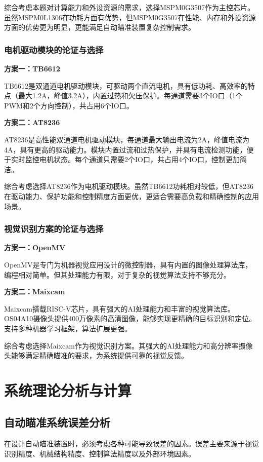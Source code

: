 \documentclass[12pt,a4paper]{ctexart}
\begin{document}
综合考虑本题对计算能力和外设资源的需求，选择MSPM0G3507作为主控芯片。虽然MSPM0L1306在功耗方面有优势，但MSPM0G3507在性能、内存和外设资源方面的优势更为明显，更能满足自动瞄准装置复杂控制需求。

\subsubsection{\textbf{电机驱动模块的论证与选择}}
\textbf{方案一：TB6612}

TB6612是双通道电机驱动模块，可驱动两个直流电机，具有低功耗、高效率的特点（最大1.2A，峰值3.2A），内置过热和欠压保护。每通道需要3个IO口（1个PWM和2个方向控制），共占用6个IO口。

\textbf{方案二：AT8236}

AT8236是高性能双通道电机驱动模块，每通道最大输出电流为2A，峰值电流为4A，具有更高的驱动能力。模块内置过流和过热保护，并具有电流检测功能，便于实时监控电机状态。每个通道只需要2个IO口，共占用4个IO口，控制更加简洁。

综合考虑选择AT8236作为电机驱动模块。虽然TB6612功耗相对较低，但AT8236在驱动能力、保护功能和控制精度方面更优，更适合需要高负载和精确控制的应用场景。

\subsubsection{\textbf{视觉识别方案的论证与选择}}
\textbf{方案一：OpenMV}

OpenMV是专门为机器视觉应用设计的微控制器，具有内置的图像处理算法库，编程相对简单。但其处理能力有限，对于复杂的视觉算法支持不够充分。

\textbf{方案二：Maixcam}

Maixcam搭载RISC-V芯片，具有强大的AI处理能力和丰富的视觉算法库。OS04A10摄像头提供400万像素的高清图像，能够实现更精确的目标识别和定位。支持多种机器学习框架，算法扩展更强。

综合考虑选择Maixcam作为视觉识别方案。其强大的AI处理能力和高分辨率摄像头能够满足精确瞄准的要求，为系统提供可靠的视觉反馈。

\section{\textbf{系统理论分析与计算}}

\subsection{\textbf{自动瞄准系统误差分析}}
在设计自动瞄准装置时，必须考虑各种可能导致误差的因素。误差主要来源于视觉识别精度、机械结构精度、控制算法精度以及外部环境因素。
\end{document}
